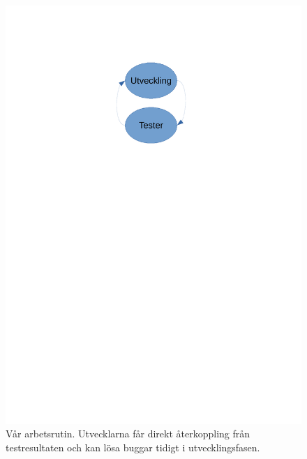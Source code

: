\documentclass[a4paper]{article}
\begin{document}
\begin{figure}[h]
  \centering
  \includegraphics[trim={0 19cm 1cm 3cm}, clip, scale=0.5]{figurer/arbetsrutin.pdf}
  \caption{Vår arbetsrutin. Utvecklarna får direkt återkoppling från testresultaten och kan lösa buggar tidigt i utvecklingsfasen.}
\end{figure}
\end{document}
